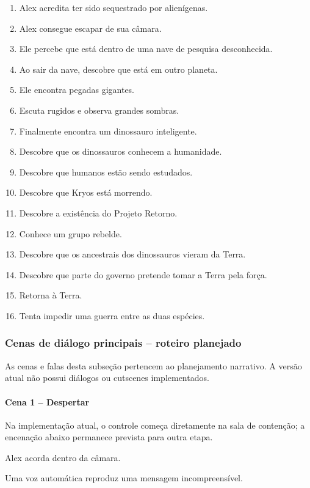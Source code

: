 \documentclass[12pt,a4paper]{article}
\begin{document}
\begin{enumerate}
    \item Alex acredita ter sido sequestrado por alienígenas.
    \item Alex consegue escapar de sua câmara.
    \item Ele percebe que está dentro de uma nave de pesquisa desconhecida.
    \item Ao sair da nave, descobre que está em outro planeta.
    \item Ele encontra pegadas gigantes.
    \item Escuta rugidos e observa grandes sombras.
    \item Finalmente encontra um dinossauro inteligente.
    \item Descobre que os dinossauros conhecem a humanidade.
    \item Descobre que humanos estão sendo estudados.
    \item Descobre que Kryos está morrendo.
    \item Descobre a existência do Projeto Retorno.
    \item Conhece um grupo rebelde.
    \item Descobre que os ancestrais dos dinossauros vieram da Terra.
    \item Descobre que parte do governo pretende tomar a Terra pela força.
    \item Retorna à Terra.
    \item Tenta impedir uma guerra entre as duas espécies.
\end{enumerate}

\subsubsection*{Cenas de diálogo principais -- roteiro planejado}

As cenas e falas desta subseção pertencem ao planejamento narrativo.
A versão atual não possui diálogos ou cutscenes implementados.


\paragraph{Cena 1 -- Despertar}

Na implementação atual, o controle começa diretamente na sala de
contenção; a encenação abaixo permanece prevista para outra etapa.


Alex acorda dentro da câmara.

Uma voz automática reproduz uma mensagem incompreensível.
\end{document}
